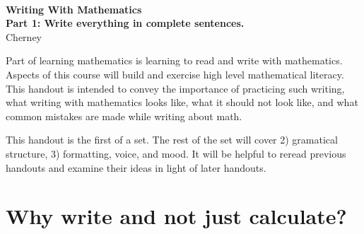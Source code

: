 \documentclass[12pt]{article}
\begin{document}
\thispagestyle{empty}
~
\vspace{-3.9cm}
\begin{center}
{
\Large
 {\bf  Writing With Mathematics\\
 Part 1: Write everything in complete sentences.}  \\[10mm]
 {  
 \vspace{-.9cm} 
Cherney}\\[1mm]
\vspace{3.5mm}
}

\end{center}

\setcounter{footnote}{0}
\setcounter{page}{1}

Part of learning mathematics is learning to read and write with mathematics.  
Aspects of this course will build and exercise high level mathematical literacy. 
This handout is intended to convey the importance of practicing such writing,
what writing with mathematics looks like, what it should not look like, and what common mistakes are made while writing about math. 


This handout is the first of a set. The rest of the set will cover 
2) gramatical structure,
3) formatting, voice, and mood.
It will be helpful to reread previous handouts and examine their ideas in light of later handouts.


\section*{Why write and not just calculate?} 
\end{document}
